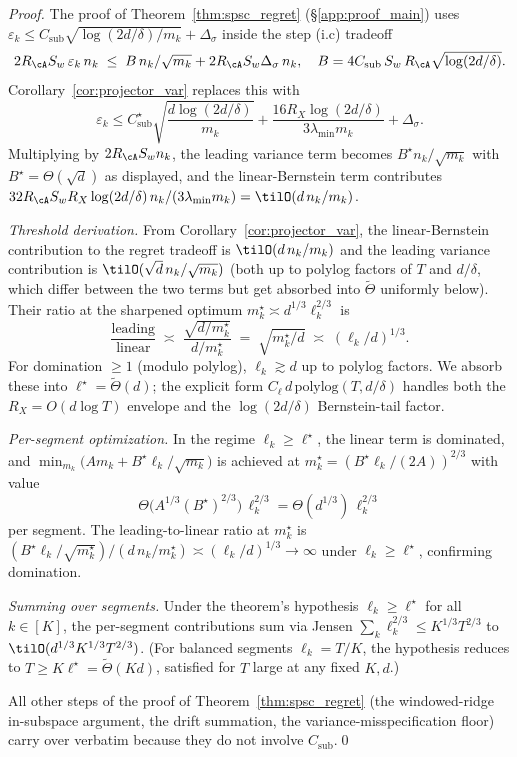 \begin{proof}
The proof of Theorem~\ref{thm:spsc_regret} (\S\ref{app:proof_main})
uses $\varepsilon_k\le C_{\mathrm{sub}}\sqrt{\log(2d/\delta)/m_k}+\Delta_\sigma$
inside the step (i.c) tradeoff
\[
2R_\cA S_w\,\varepsilon_k\,n_k \;\le\; B\,n_k/\sqrt{m_k} + 2R_\cA S_w\Delta_\sigma\,n_k,
\quad B = 4 C_{\mathrm{sub}}\,S_w\,R_\cA\sqrt{\log(2d/\delta)}.
\]
Corollary~\ref{cor:projector_var} replaces this with
\[
\varepsilon_k \le C_{\mathrm{sub}}^\star\sqrt{\frac{d\log(2d/\delta)}{m_k}}
+\frac{16 R_X\log(2d/\delta)}{3\lambda_{\min}m_k}+\Delta_\sigma.
\]
Multiplying by $2R_\cA S_w n_k$, the leading variance term becomes
$B^\star n_k/\sqrt{m_k}$ with $B^\star = \Theta(\sqrt d)$ as displayed,
and the linear-Bernstein term contributes
$32 R_\cA S_w R_X \log(2d/\delta)\,n_k/(3\lambda_{\min}m_k) = \tilO(d\,n_k/m_k)$.

\emph{Threshold derivation.} From Corollary~\ref{cor:projector_var},
the linear-Bernstein contribution to the regret tradeoff is
$\tilO(d\,n_k/m_k)$ and the leading variance contribution is
$\tilO(\sqrt d\,n_k/\sqrt{m_k})$ (both up to polylog factors of
$T$ and $d/\delta$, which differ between the two terms but get
absorbed into $\tilde\Theta$ uniformly below). Their ratio at the sharpened optimum
$m_k^\star\asymp d^{1/3}\ell_k^{2/3}$ is
\[
\frac{\text{leading}}{\text{linear}}
\;\asymp\;
\frac{\sqrt{d/m_k^\star}}{d/m_k^\star}
\;=\;\sqrt{m_k^\star/d}
\;\asymp\;(\ell_k/d)^{1/3}.
\]
For domination $\ge 1$ (modulo polylog), $\ell_k\gtrsim d$ up to
polylog factors. We absorb these into $\ell^\star = \tilde\Theta(d)$;
the explicit form $C_\ell\,d\,\mathrm{polylog}(T,d/\delta)$ handles
both the $R_X = O(d\log T)$ envelope and the $\log(2d/\delta)$
Bernstein-tail factor.

\emph{Per-segment optimization.} In the regime $\ell_k\ge\ell^\star$,
the linear term is dominated, and
$\min_{m_k}\bigl(A m_k+B^\star\ell_k/\sqrt{m_k}\bigr)$
is achieved at $m_k^\star = (B^\star\ell_k/(2A))^{2/3}$ with value
\[
\Theta\bigl(A^{1/3}(B^\star)^{2/3}\bigr)\,\ell_k^{2/3} = \Theta(d^{1/3})\,\ell_k^{2/3}
\]
per segment. The leading-to-linear ratio at $m_k^\star$ is
$(B^\star\ell_k/\sqrt{m_k^\star})/(d\,n_k/m_k^\star)
\asymp (\ell_k/d)^{1/3}\to\infty$ under $\ell_k\ge\ell^\star$, confirming
domination.

\emph{Summing over segments.} Under the theorem's hypothesis
$\ell_k\ge\ell^\star$ for all $k\in[K]$, the per-segment
contributions sum via Jensen
$\sum_k\ell_k^{2/3}\le K^{1/3}T^{2/3}$ to
$\tilO(d^{1/3}K^{1/3}T^{2/3})$. (For balanced segments
$\ell_k=T/K$, the hypothesis reduces to $T\ge K\ell^\star=\tilde\Theta(Kd)$,
satisfied for $T$ large at any fixed $K,d$.)

All other steps of the proof of Theorem~\ref{thm:spsc_regret} (the
windowed-ridge in-subspace argument, the drift summation, the
variance-misspecification floor) carry over verbatim because they do
not involve $C_{\mathrm{sub}}$.\qed
\end{proof}

